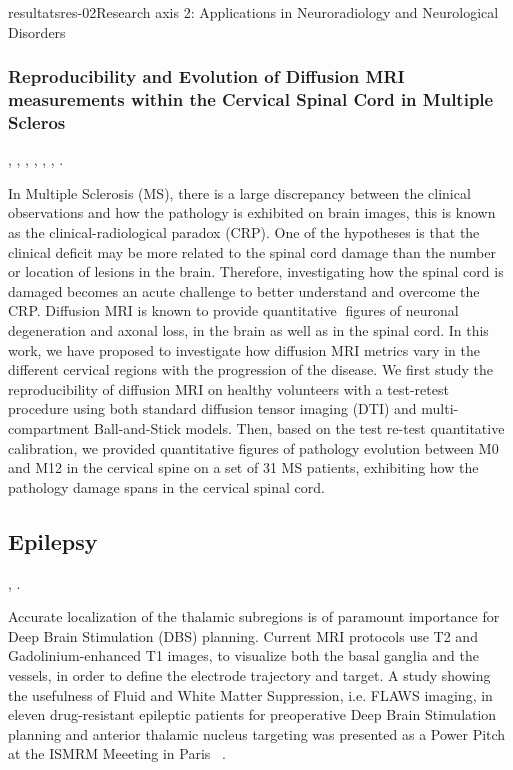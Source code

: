 \documentclass{ra2018}
\begin{document}
\begin{module}{resultats}{res-02}{Research axis 2: Applications in Neuroradiology and Neurological Disorders}
\subsubsection{Reproducibility and Evolution of Diffusion MRI measurements within the Cervical Spinal Cord in Multiple Scleros}
\begin{participants}
	,
	,
	,
	,
	,
	,
	.
\end{participants}
In Multiple Sclerosis (MS), there is a large discrepancy between the clinical observations and how the pathology is exhibited on brain images, this is known as the clinical-radiological paradox (CRP). One of the hypotheses is that the clinical deficit may be more related to the spinal cord damage than the number or location of lesions in the brain. Therefore, investigating how the spinal cord is damaged becomes an acute challenge to better understand and overcome the CRP. Diffusion MRI is known to provide quantitative figures of neuronal degeneration and axonal loss, in the brain as well as in the spinal cord. In this work, we have proposed to investigate how diffusion MRI metrics vary in the different cervical regions with the progression of the disease. We first study the reproducibility of diffusion MRI on healthy volunteers with a test-retest procedure using both standard diffusion tensor imaging (DTI) and multi-compartment Ball-and-Stick models. Then, based on the test re-test quantitative calibration, we provided quantitative figures of pathology evolution between M0 and M12 in the cervical spine on a set of 31 MS patients, exhibiting how the pathology damage spans in the cervical spinal cord.

\subsection{Epilepsy}
\begin{participants}
      ,
      .
\end{participants}

Accurate localization of the thalamic subregions is of paramount importance for Deep Brain Stimulation (DBS) planning. Current MRI protocols use T2 and Gadolinium-enhanced T1 images, to visualize both the basal ganglia and the vessels, in order to define the electrode trajectory and target. A study showing the usefulness of Fluid and White Matter Suppression, i.e. FLAWS imaging, in eleven drug-resistant epileptic patients for preoperative Deep Brain Stimulation planning and anterior thalamic nucleus targeting was presented as a Power Pitch at the ISMRM Meeeting in Paris ~\cite{bannier:inserm-01939451}.


\end{module}
\end{document}
